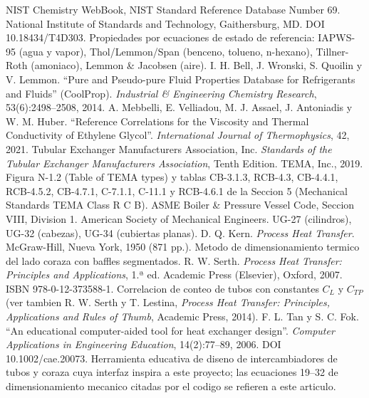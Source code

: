 \documentclass[11pt,a4paper]{article}
\begin{document}
\begin{enumerate}[label={[\arabic*]}, leftmargin=1.6em]
 NIST Chemistry WebBook, NIST Standard Reference Database Number 69. National Institute of Standards and Technology, Gaithersburg, MD. DOI 10.18434/T4D303. Propiedades por ecuaciones de estado de referencia: IAPWS-95 (agua y vapor), Thol/Lemmon/Span (benceno, tolueno, n-hexano), Tillner-Roth (amoniaco), Lemmon \& Jacobsen (aire).
 I. H. Bell, J. Wronski, S. Quoilin y V. Lemmon. ``Pure and Pseudo-pure Fluid Properties Database for Refrigerants and Fluids'' (CoolProp). \emph{Industrial \& Engineering Chemistry Research}, 53(6):2498--2508, 2014.
 A. Mebbelli, E. Velliadou, M. J. Assael, J. Antoniadis y W. M. Huber. ``Reference Correlations for the Viscosity and Thermal Conductivity of Ethylene Glycol''. \emph{International Journal of Thermophysics}, 42, 2021.
 Tubular Exchanger Manufacturers Association, Inc. \emph{Standards of the Tubular Exchanger Manufacturers Association}, Tenth Edition. TEMA, Inc., 2019. Figura N-1.2 (Table of TEMA types) y tablas CB-3.1.3, RCB-4.3, CB-4.4.1, RCB-4.5.2, CB-4.7.1, C-7.1.1, C-11.1 y RCB-4.6.1 de la Seccion 5 (Mechanical Standards TEMA Class R C B).
 ASME Boiler \& Pressure Vessel Code, Seccion VIII, Division 1. American Society of Mechanical Engineers. UG-27 (cilindros), UG-32 (cabezas), UG-34 (cubiertas planas).
 D. Q. Kern. \emph{Process Heat Transfer}. McGraw-Hill, Nueva York, 1950 (871 pp.). Metodo de dimensionamiento termico del lado coraza con baffles segmentados.
 R. W. Serth. \emph{Process Heat Transfer: Principles and Applications}, 1.ª ed. Academic Press (Elsevier), Oxford, 2007. ISBN 978-0-12-373588-1. Correlacion de conteo de tubos con constantes $C_L$ y $C_{TP}$ (ver tambien R. W. Serth y T. Lestina, \emph{Process Heat Transfer: Principles, Applications and Rules of Thumb}, Academic Press, 2014).
 F. L. Tan y S. C. Fok. ``An educational computer-aided tool for heat exchanger design''. \emph{Computer Applications in Engineering Education}, 14(2):77--89, 2006. DOI 10.1002/cae.20073. Herramienta educativa de diseno de intercambiadores de tubos y coraza cuya interfaz inspira a este proyecto; las ecuaciones 19--32 de dimensionamiento mecanico citadas por el codigo se refieren a este articulo.
\end{enumerate}
\end{document}
